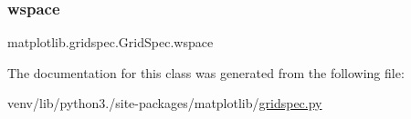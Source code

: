 \mbox{\label{classmatplotlib_1_1gridspec_1_1GridSpec_acb3157430c1133f037b691123d635a54}} 
\subsubsection{\texorpdfstring{wspace}{wspace}}
{\footnotesize\ttfamily matplotlib.\+gridspec.\+Grid\+Spec.\+wspace}



The documentation for this class was generated from the following file\+:\begin{DoxyCompactItemize}
\item 
venv/lib/python3./site-\/packages/matplotlib/\hyperlink{gridspec_8py}{gridspec.\+py}\end{DoxyCompactItemize}
